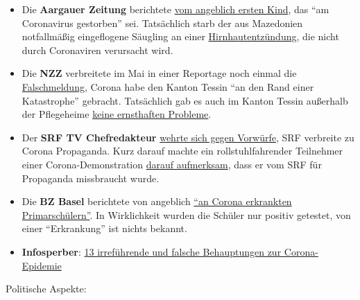 \begin{itemize}
\tightlist
\item
  Die \textbf{Aargauer Zeitung} berichtete
  \href{https://www.aargauerzeitung.ch/aargau/kanton-aargau/erstes-kind-am-coronavirus-gestorben-aargauer-saeugling-zur-behandlung-heimgeflogen-137988950}{vom
  angeblich ersten Kind}, das ``am Coronavirus gestorben'' sei.
  Tatsächlich starb der aus Mazedonien notfallmäßig eingeflogene
  Säugling an einer
  \href{https://www.srf.ch/news/regional/aargau-solothurn/verwirrung-um-todesursache-trauriges-ereignis-aargauer-baby-stirbt-nach-corona-infektion}{Hirnhautentzündung},
  die nicht durch Coronaviren verursacht wird.
\item
  Die \textbf{NZZ} verbreitete im Mai in einer Reportage noch einmal die
  \href{https://www.nzz.ch/gesellschaft/wie-corona-das-tessin-an-den-rand-einer-katastrophe-brachte-und-die-willensnation-auf-die-probe-stellte-ld.1556749}{Falschmeldung},
  Corona habe den Kanton Tessin ``an den Rand einer Katastrophe''
  gebracht. Tatsächlich gab es auch im Kanton Tessin außerhalb der
  Pflegeheime
  \href{https://www.blick.ch/news/schweiz/tessin/tessiner-spitaldirektor-widerspricht-dem-bundesamt-fuer-gesundheit-wir-haben-genuegend-intensivbetten-id15808076.html}{keine
  ernsthaften Probleme}.
\item
  Der \textbf{SRF TV Chefredakteur}
  \href{https://www.srf.ch/news/schweiz/berichterstattung-zu-corona-srf-chefredaktor-nimmt-stellung-zu-fakenews-vorwuerfen}{wehrte
  sich gegen Vorwürfe}, SRF verbreite zu Corona Propaganda. Kurz darauf
  machte ein rollstuhlfahrender Teilnehmer einer Corona-Demonstration
  \href{https://www.youtube.com/watch?v=9BA83YQT7AE}{darauf aufmerksam},
  dass er vom SRF für Propaganda missbraucht wurde.
\item
  Die \textbf{BZ Basel} berichtete von angeblich
  \href{https://www.bzbasel.ch/basel/basel-stadt/basler-primarschueler-an-corona-erkrankt-muessen-schulen-jetzt-ueber-die-buecher-137988954}{``an
  Corona erkrankten Primarschülern''}. In Wirklich­keit wurden die
  Schüler nur positiv getestet, von einer ``Erkrankung'' ist nichts
  bekannt.
\item
  \textbf{Infosperber}:
  \href{https://www.infosperber.ch/Artikel/Gesundheit/13-irrefuhrende-und-falsche-Behauptungen-zur-Corona-Epidemie}{13
  irreführende und falsche Behauptungen zur Corona-Epidemie}
\end{itemize}

Politische Aspekte:

